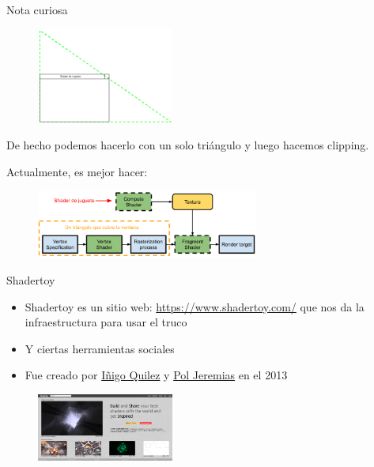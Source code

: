\begin{frame}{Nota curiosa}
\begin{figure}[htp]
  \centering
  \includegraphics[width=0.4\textwidth]{img/onetriangle}
\end{figure}
De hecho podemos hacerlo con un solo triángulo y luego hacemos clipping.
\end{frame}

\begin{frame}{Actualmente, es mejor hacer:}
\begin{figure}[htp]
  \centering
  \includegraphics[width=0.65\textwidth]{img/TrucoModerno}
\end{figure}
\end{frame}

\begin{frame}{Shadertoy}
\begin{itemize}
    \item Shadertoy es un sitio web: \url{https://www.shadertoy.com/} que nos da la infraestructura para usar el truco
    \item Y ciertas herramientas sociales
    \item Fue creado por \href{https://iquilezles.org/}{Iñigo Quilez} y \href{https://www.poljeremias.com/}{Pol Jeremias} en el 2013
\end{itemize}
\begin{figure}[htp]
  \centering
  \includegraphics[width=0.4\textwidth]{img/ShaderToySite}
\end{figure}
\end{frame}

